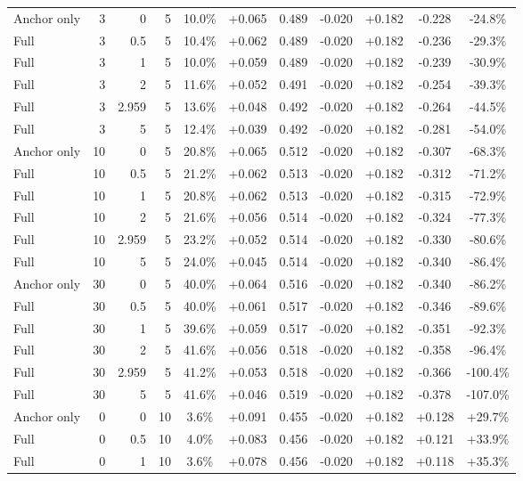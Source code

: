 \begin{table}[htbp]
\begin{tabular}{lrrrccccccc}
Anchor only & 3 & 0 & 5 & 10.0\% & +0.065 & 0.489 & -0.020 & +0.182 & -0.228 & -24.8\% \\
Full & 3 & 0.5 & 5 & 10.4\% & +0.062 & 0.489 & -0.020 & +0.182 & -0.236 & -29.3\% \\
Full & 3 & 1 & 5 & 10.0\% & +0.059 & 0.489 & -0.020 & +0.182 & -0.239 & -30.9\% \\
Full & 3 & 2 & 5 & 11.6\% & +0.052 & 0.491 & -0.020 & +0.182 & -0.254 & -39.3\% \\
Full & 3 & 2.959 & 5 & 13.6\% & +0.048 & 0.492 & -0.020 & +0.182 & -0.264 & -44.5\% \\
Full & 3 & 5 & 5 & 12.4\% & +0.039 & 0.492 & -0.020 & +0.182 & -0.281 & -54.0\% \\
Anchor only & 10 & 0 & 5 & 20.8\% & +0.065 & 0.512 & -0.020 & +0.182 & -0.307 & -68.3\% \\
Full & 10 & 0.5 & 5 & 21.2\% & +0.062 & 0.513 & -0.020 & +0.182 & -0.312 & -71.2\% \\
Full & 10 & 1 & 5 & 20.8\% & +0.062 & 0.513 & -0.020 & +0.182 & -0.315 & -72.9\% \\
Full & 10 & 2 & 5 & 21.6\% & +0.056 & 0.514 & -0.020 & +0.182 & -0.324 & -77.3\% \\
Full & 10 & 2.959 & 5 & 23.2\% & +0.052 & 0.514 & -0.020 & +0.182 & -0.330 & -80.6\% \\
Full & 10 & 5 & 5 & 24.0\% & +0.045 & 0.514 & -0.020 & +0.182 & -0.340 & -86.4\% \\
Anchor only & 30 & 0 & 5 & 40.0\% & +0.064 & 0.516 & -0.020 & +0.182 & -0.340 & -86.2\% \\
Full & 30 & 0.5 & 5 & 40.0\% & +0.061 & 0.517 & -0.020 & +0.182 & -0.346 & -89.6\% \\
Full & 30 & 1 & 5 & 39.6\% & +0.059 & 0.517 & -0.020 & +0.182 & -0.351 & -92.3\% \\
Full & 30 & 2 & 5 & 41.6\% & +0.056 & 0.518 & -0.020 & +0.182 & -0.358 & -96.4\% \\
Full & 30 & 2.959 & 5 & 41.2\% & +0.053 & 0.518 & -0.020 & +0.182 & -0.366 & -100.4\% \\
Full & 30 & 5 & 5 & 41.6\% & +0.046 & 0.519 & -0.020 & +0.182 & -0.378 & -107.0\% \\
Anchor only & 0 & 0 & 10 & 3.6\% & +0.091 & 0.455 & -0.020 & +0.182 & +0.128 & +29.7\% \\
Full & 0 & 0.5 & 10 & 4.0\% & +0.083 & 0.456 & -0.020 & +0.182 & +0.121 & +33.9\% \\
Full & 0 & 1 & 10 & 3.6\% & +0.078 & 0.456 & -0.020 & +0.182 & +0.118 & +35.3\% \\

\end{tabular}
\end{table}

